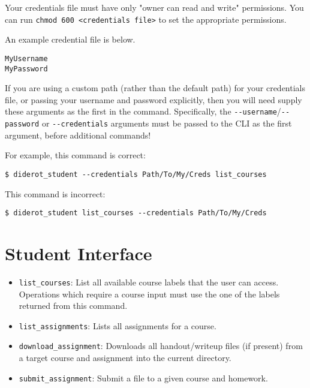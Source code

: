 \begin{important}
Your credentials file must have only "owner can read and write" permissions. 
%
You can  run \verb|chmod 600 <credentials file>| to set the appropriate permissions.
\end{important}

\begin{example}
An example credential file is below.
\begin{verbatim}
MyUsername
MyPassword
\end{verbatim}
\end{example}

\begin{important}
If you are using a custom path (rather than the default path) for your credentials file, or passing your username and password explicitly, then you will need supply these arguments as the first in the command.
%
Specifically, the
%
\verb|--username|/\verb|--password| or \verb|--credentials| 
%
arguments must be passed to the CLI as the first argument, before
additional commands!

For example, this command is correct:
\begin{verbatim}
$ diderot_student --credentials Path/To/My/Creds list_courses
\end{verbatim}
  
This command is incorrect:
\begin{verbatim}
$ diderot_student list_courses --credentials Path/To/My/Creds
\end{verbatim}
\end{important}

\section{Student Interface}

\begin{itemize}
  \item \verb|list_courses|: List all available course labels that the user can access.
    Operations which require a course input must use the one of the labels returned from this command.
  \item \verb|list_assignments|: Lists all assignments for a course.
  \item \verb|download_assignment|: Downloads all handout/writeup files (if present) from a
    target course and assignment into the current directory.
  \item \verb|submit_assignment|: Submit a file to a given course and homework.
\end{itemize}

